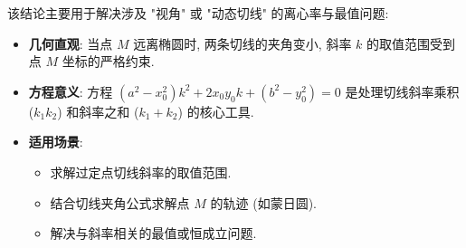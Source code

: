 \begin{explanationbox}
该结论主要用于解决涉及 "视角" 或 "动态切线" 的离心率与最值问题:
\begin{itemize}
    \item \textbf{几何直观}: 当点 $M$ 远离椭圆时, 两条切线的夹角变小, 斜率 $k$ 的取值范围受到点 $M$ 坐标的严格约束.
    \item \textbf{方程意义}: 方程 $(a^2 - x_0^2)k^2 + 2x_0y_0k + (b^2 - y_0^2) = 0$ 是处理切线斜率乘积 ($k_1k_2$) 和斜率之和 ($k_1+k_2$) 的核心工具.
    \item \textbf{适用场景}:
    \begin{itemize}
        \item 求解过定点切线斜率的取值范围.
        \item 结合切线夹角公式求解点 $M$ 的轨迹 (如蒙日圆).
        \item 解决与斜率相关的最值或恒成立问题.
    \end{itemize}
\end{itemize}
\end{explanationbox}